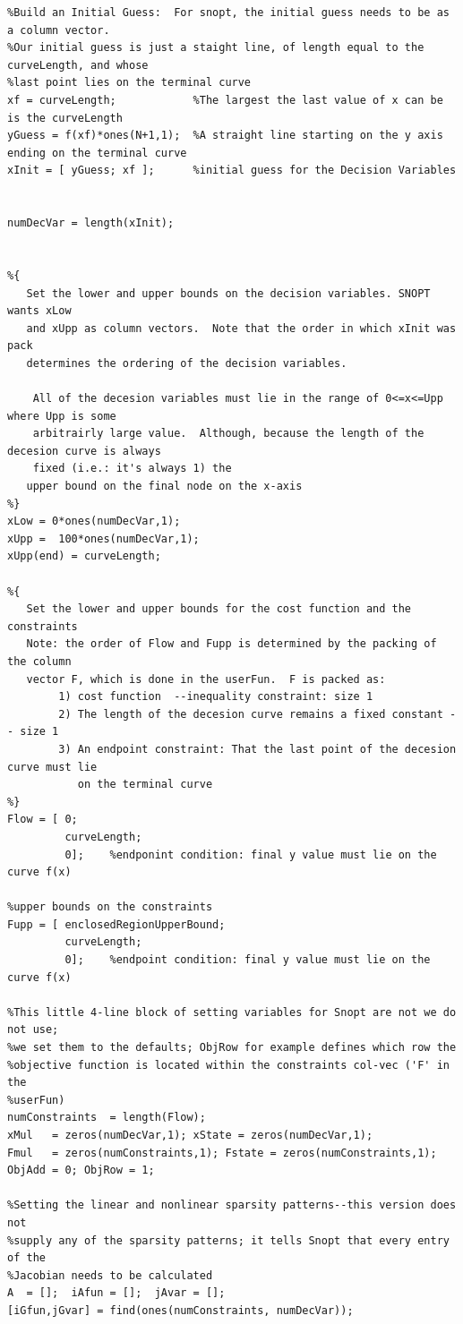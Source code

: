 \documentclass[10pt]{article}
\begin{document}
{{\begin{verbatim}
%Build an Initial Guess:  For snopt, the initial guess needs to be as a column vector.
%Our initial guess is just a staight line, of length equal to the curveLength, and whose
%last point lies on the terminal curve
xf = curveLength;            %The largest the last value of x can be is the curveLength
yGuess = f(xf)*ones(N+1,1);  %A straight line starting on the y axis ending on the terminal curve
xInit = [ yGuess; xf ];      %initial guess for the Decision Variables


numDecVar = length(xInit);


%{
   Set the lower and upper bounds on the decision variables. SNOPT wants xLow
   and xUpp as column vectors.  Note that the order in which xInit was pack
   determines the ordering of the decision variables.

    All of the decesion variables must lie in the range of 0<=x<=Upp where Upp is some
    arbitrairly large value.  Although, because the length of the decesion curve is always
    fixed (i.e.: it's always 1) the
   upper bound on the final node on the x-axis
%}
xLow = 0*ones(numDecVar,1);
xUpp =  100*ones(numDecVar,1);
xUpp(end) = curveLength;

%{
   Set the lower and upper bounds for the cost function and the constraints
   Note: the order of Flow and Fupp is determined by the packing of the column
   vector F, which is done in the userFun.  F is packed as:
        1) cost function  --inequality constraint: size 1
        2) The length of the decesion curve remains a fixed constant -- size 1
        3) An endpoint constraint: That the last point of the decesion curve must lie
           on the terminal curve
%}
Flow = [ 0;
         curveLength;
         0];    %endponint condition: final y value must lie on the curve f(x)

%upper bounds on the constraints
Fupp = [ enclosedRegionUpperBound;
         curveLength;
         0];    %endpoint condition: final y value must lie on the curve f(x)

%This little 4-line block of setting variables for Snopt are not we do not use;
%we set them to the defaults; ObjRow for example defines which row the
%objective function is located within the constraints col-vec ('F' in the
%userFun)
numConstraints  = length(Flow);
xMul   = zeros(numDecVar,1); xState = zeros(numDecVar,1);
Fmul   = zeros(numConstraints,1); Fstate = zeros(numConstraints,1);
ObjAdd = 0; ObjRow = 1;

%Setting the linear and nonlinear sparsity patterns--this version does not
%supply any of the sparsity patterns; it tells Snopt that every entry of the
%Jacobian needs to be calculated
A  = [];  iAfun = [];  jAvar = [];
[iGfun,jGvar] = find(ones(numConstraints, numDecVar));


\end{verbatim}}}
\end{document}
